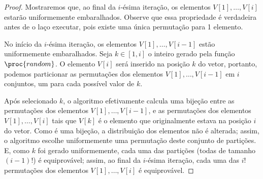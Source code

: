 \begin{proof}
    Mostraremos que, ao final da $i$-ésima iteração,
    os elementos $V[1], \dots, V[i]$
    estarão uniformemente embaralhados.
    Observe que essa propriedade é verdadeira antes de o laço executar,
    pois existe uma única permutação para 1 elemento.

    No início da $i$-ésima iteração,
    os elementos $V[1], \dots, V[i-1]$
    estão uniformemente embaralhados.
    Seja $k \in [1, i]$ o inteiro gerado pela função $\proc{random}$.
    O elemento $V[i]$ será inserido na posição $k$ do vetor,
    portanto,
    podemos particionar as permutações dos elementos $V[1], \dots, V[i-1]$
    em $i$ conjuntos,
    um para cada possível valor de $k$.

    Após selecionado $k$,
    o algoritmo efetivamente calcula uma bijeção entre
    as permutações dos elementos $V[1], \dots, V[i-1]$,
    e as permutações dos elementos $V[1], \dots, V[i]$ tais que
    $V[k]$ é o elemento que originalmente estava na posição $i$ do vetor.
    Como é uma bijeção,
    a distribuição dos elementos não é alterada;
    assim, o algoritmo escolhe uniformemente uma permutação
    deste conjunto de partições.
    E, como $k$ foi gerado uniformemente,
    cada uma das partições (todas de tamanho $(i-1)!$) é equiprovável;
    assim, ao final da $i$-ésima iteração,
    cada uma das $i!$ permutações dos elementos $V[1], \dots, V[i]$
    é equiprovável.
\end{proof}
